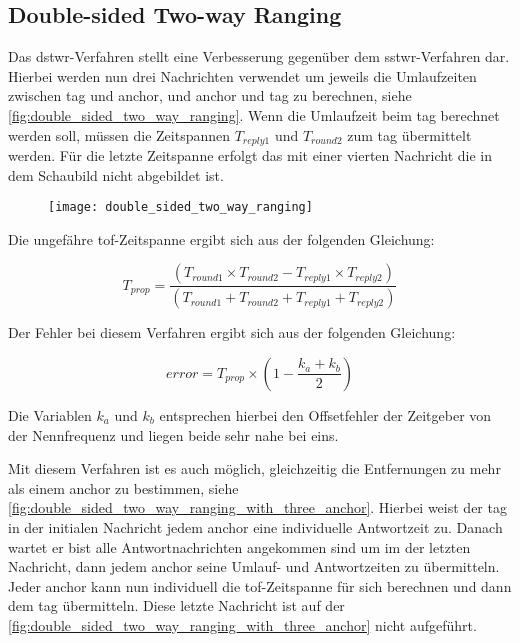 \subsection{Double-sided Two-way Ranging}
\label{subsec:double_sided_two_way_ranging}

Das \Gls{dstwr}-Verfahren stellt eine Verbesserung gegenüber dem \Gls{sstwr}-Verfahren dar. Hierbei werden nun drei Nachrichten verwendet um jeweils die Umlaufzeiten zwischen \Gls{tag} und \Gls{anchor}, und \Gls{anchor} und \Gls{tag} zu berechnen, siehe \autoref{fig:double_sided_two_way_ranging}. Wenn die Umlaufzeit beim \Gls{tag} berechnet werden soll, müssen die Zeitspannen $T_{reply1}$ und $T_{round2}$ zum \Gls{tag} übermittelt werden. Für die letzte Zeitspanne erfolgt das mit einer vierten Nachricht die in dem Schaubild nicht abgebildet ist. \cite{decawave2015twr, decawave2016dw1kusermanual}

\begin{figure}
	\centering
	\texttt{[image: double\_sided\_two\_way\_ranging]}
	\label{fig:double_sided_two_way_ranging}
\end{figure}

Die ungefähre \Gls{tof}-Zeitspanne ergibt sich aus der folgenden Gleichung:

\begin{equation}
T_{prop} = \frac{\left(T_{round1}\times T_{round2}-T_{reply1}\times T_{reply2}\right)}{\left(T_{round1}+T_{round2}+T_{reply1}+T_{reply2}\right)}
\end{equation}

Der Fehler bei diesem Verfahren ergibt sich aus der folgenden Gleichung:

\begin{equation}
error=T_{prop}\times\left(1-\frac{k_a+k_b}{2}\right)
\end{equation}

Die Variablen $k_a$ und $k_b$ entsprechen hierbei den Offsetfehler der Zeitgeber von der Nennfrequenz und liegen beide sehr nahe bei eins.

Mit diesem Verfahren ist es auch möglich, gleichzeitig die Entfernungen zu mehr als einem \Gls{anchor} zu bestimmen, siehe \autoref{fig:double_sided_two_way_ranging_with_three_anchor}. Hierbei weist der \Gls{tag} in der initialen Nachricht jedem \Gls{anchor} eine individuelle Antwortzeit zu. Danach wartet er bist alle Antwortnachrichten angekommen sind um im der letzten Nachricht, dann jedem \Gls{anchor} seine Umlauf- und Antwortzeiten zu übermitteln. Jeder \Gls{anchor} kann nun individuell die \Gls{tof}-Zeitspanne für sich berechnen und dann dem \Gls{tag} übermitteln. Diese letzte Nachricht ist auf der \autoref{fig:double_sided_two_way_ranging_with_three_anchor} nicht aufgeführt.

